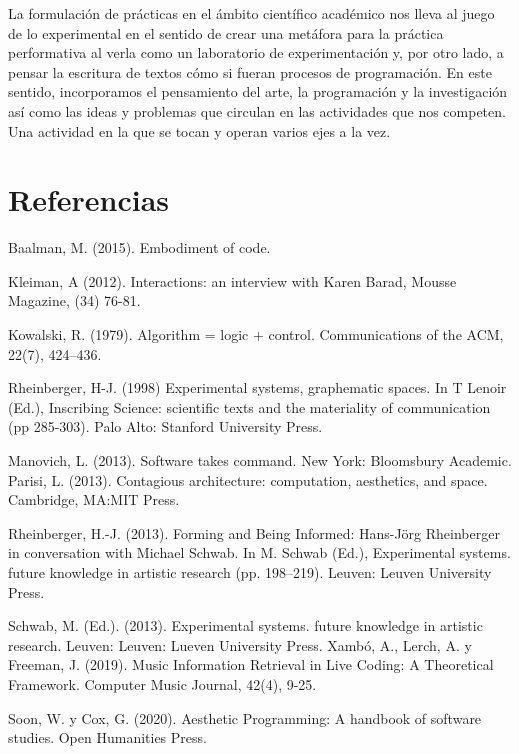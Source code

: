 La formulación de prácticas en el ámbito científico académico nos lleva al juego de lo experimental en el sentido de crear una metáfora para la práctica performativa al verla como un laboratorio de experimentación y, por otro lado, a pensar la escritura de textos cómo si fueran procesos de programación. En este sentido, incorporamos el pensamiento del arte, la programación y la investigación así como las ideas y problemas que circulan en las actividades que nos competen. Una actividad en la que se tocan y operan varios ejes a la vez.

\section{Referencias}

Baalman, M. (2015). Embodiment of code.

Kleiman, A (2012). Interactions: an interview with Karen Barad, Mousse Magazine, (34) 76-81.

Kowalski, R. (1979). Algorithm = logic + control. Communications of the ACM, 22(7), 424–436.

Rheinberger, H-J. (1998) Experimental systems, graphematic spaces. In T Lenoir (Ed.), Inscribing Science: scientific texts and the materiality of communication (pp 285-303). Palo Alto: Stanford University Press.

Manovich, L. (2013). Software takes command. New York: Bloomsbury Academic.
Parisi, L. (2013). Contagious architecture: computation, aesthetics, and space. Cambridge, MA:MIT Press.

Rheinberger, H.-J. (2013). Forming and Being Informed: Hans-Jörg Rheinberger in conversation with Michael Schwab. In M. Schwab (Ed.), Experimental systems. future knowledge in artistic research (pp. 198–219). Leuven: Leuven University Press.

Schwab, M. (Ed.). (2013). Experimental systems. future knowledge in artistic research. Leuven: Leuven: Lueven University Press.
Xambó, A., Lerch, A. y Freeman, J. (2019). Music Information Retrieval in Live Coding: A Theoretical Framework. Computer Music Journal, 42(4), 9-25.

Soon, W. y Cox, G. (2020). Aesthetic Programming: A handbook of software studies. Open Humanities Press.

\theendnotes

